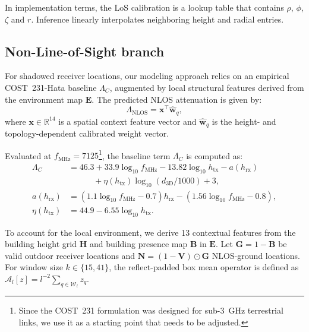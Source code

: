 \documentclass[10pt,conference,letterpaper]{IEEEtran}
\begin{document}
In implementation terms, the LoS calibration is a lookup table that contains $\rho$, $\phi$, $\zeta$ and $r$. Inference linearly interpolates neighboring height and radial entries.

\subsection{Non-Line-of-Sight branch}
\label{sec:nlos}

For shadowed receiver locations, our modeling approach relies on an empirical COST~231-Hata baseline $\Lambda_C$, augmented by local structural features derived from the environment map $\mathbf{E}$. The predicted NLOS attenuation is given by:
\begin{equation}
\Lambda_{\text{NLOS}} = \mathbf{x}^\top \hat{\mathbf{w}}_q,
\label{eq:pl_nlos}
\end{equation}
where $\mathbf{x} \in \mathbb{R}^{14}$ is a spatial context feature vector and $\hat{\mathbf{w}}_q$ is the height- and topology-dependent calibrated weight vector.

Evaluated at $f_{\text{MHz}} = 7125$\footnote{Since the COST~231 formulation was designed for sub-3~GHz terrestrial links, we use it as a starting point that needs to be adjusted.}, the baseline term $\Lambda_C$ is computed as:
\begin{align}
\Lambda_C &= 46.3 + 33.9 \log_{10} f_{\text{MHz}} - 13.82 \log_{10} h_{\text{tx}} - a(h_{\text{rx}}) \nonumber \\
&\qquad\quad + \eta(h_{\text{tx}}) \log_{10} (d_{\text{3D}}/1000) + 3,\\ a(h_{\text{rx}}) &= (1.1 \log_{10} f_{\text{MHz}} - 0.7) h_{\text{rx}} - (1.56 \log_{10} f_{\text{MHz}} - 0.8), \\
\eta(h_{\text{tx}}) &= 44.9 - 6.55 \log_{10} h_{\text{tx}}.
\label{eq:cost}
\end{align}

To account for the local environment, we derive 13 contextual features from the building height grid $\mathbf{H}$ and building presence map $\mathbf{B}$ in $\mathbf{E}$. Let $\mathbf{G} = 1 - \mathbf{B}$ be valid outdoor receiver locations and $\mathbf{N} = (1 - \mathbf{V}) \odot \mathbf{G}$ NLOS-ground locations. For window size $k \in \{15, 41\}$, the reflect-padded box mean operator is defined as $\mathcal{A}_l[z] = l^{-2} \sum_{q \in \mathcal{W}_l} z_q$.
\end{document}
